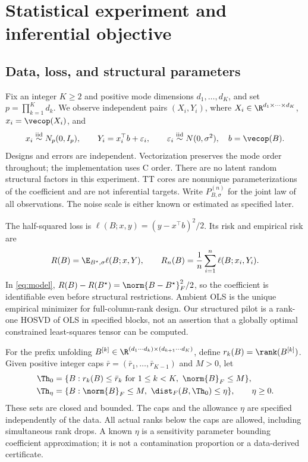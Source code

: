 \section{Statistical experiment and inferential objective}\label{sec:problem}
\subsection{Data, loss, and structural parameters}
Fix an integer $K\ge2$ and positive mode dimensions $d_1,\ldots,d_K$, and set $p=\prod_{k=1}^Kd_k$. We observe independent pairs $(X_i,Y_i)$, where $X_i\in\R^{d_1\times\cdots\times d_K}$, $x_i=\vecop(X_i)$, and
\begin{equation}\label{eq:model}
 x_i\stackrel{\rm iid}{\sim}N_p(0,I_p),\qquad
 Y_i=x_i^\top b+\varepsilon_i,\qquad
 \varepsilon_i\stackrel{\rm iid}{\sim}N(0,\sigma^2),\quad b=\vecop(B).
\end{equation}
Designs and errors are independent. Vectorization preserves the mode order throughout; the implementation uses C order. There are no latent random structural factors in this experiment. TT cores are nonunique parameterizations of the coefficient and are not inferential targets. Write $P_{B,\sigma}^{(n)}$ for the joint law of all observations. The noise scale is either known or estimated as specified later.

The half-squared loss is $\ell(B;x,y)=(y-x^\top b)^2/2$. Its risk and empirical risk are
\[
 R(B)=\E_{B^\star,\sigma}\ell(B;x,Y),\qquad
 R_n(B)=\frac1n\sum_{i=1}^n\ell(B;x_i,Y_i).
\]
In \eqref{eq:model}, $R(B)-R(B^\star)=\norm{B-B^\star}_F^2/2$, so the coefficient is identifiable even before structural restrictions. Ambient OLS is the unique empirical minimizer for full-column-rank design. Our structured pilot is a rank-one HOSVD of OLS in specified blocks, not an assertion that a globally optimal constrained least-squares tensor can be computed.

For the prefix unfolding $B^{[k]}\in\R^{(d_1\cdots d_k)\times(d_{k+1}\cdots d_K)}$, define $r_k(B)=\rank(B^{[k]})$. Given positive integer caps $\bar r=(\bar r_1,\ldots,\bar r_{K-1})$ and $M>0$, let
\begin{align*}
 \Th_0&=\{B:r_k(B)\le\bar r_k\text{ for }1\le k<K,\ \norm{B}_F\le M\},\\
 \Th_\eta&=\{B:\norm{B}_F\le M,\ \dist_F(B,\Th_0)\le\eta\},\qquad\eta\ge0.
\end{align*}
These sets are closed and bounded. The caps and the allowance $\eta$ are specified independently of the data. All actual ranks below the caps are allowed, including simultaneous rank drops. A known $\eta$ is a sensitivity parameter bounding coefficient approximation; it is not a contamination proportion or a data-derived certificate.

